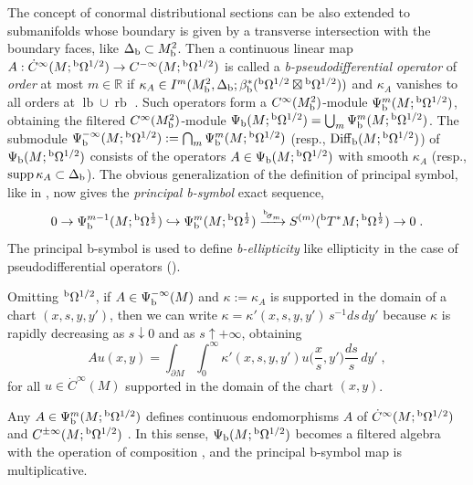 \documentclass{memo-l}
\theoremstyle{plain}
\theoremstyle{definition}
\theoremstyle{remark}
\newcommand{\R}{\mathbb{R}}
\newcommand{\supp}{\operatorname{supp}}
\newcommand{\Diff}{\operatorname{Diff}}
\newcommand{\lb}{\operatorname{lb}}
\newcommand{\rb}{\operatorname{rb}}
\newcommand{\bOmega}{{}^{\text{\rm b}}\Omega}
\newcommand{\bT}{{}^{\text{\rm b}}T}
\newcommand{\bsigma}{{}^{\text{\rm b}}\!\sigma}
\newcommand{\Psib}{\Psi_{\text{\rm b}}}
\newcommand{\Diffb}{\Diff_{\text{\rm b}}}
\newcommand{\Deltab}{\Delta_{\text{\rm b}}}
\numberwithin{section}{chapter}
\numberwithin{equation}{section}%
\begin{document}
The concept of conormal distributional sections can be also extended to submanifolds whose boundary is given by a transverse intersection with the boundary faces, like $\Deltab\subset M^2_{\text{\rm b}}$. Then a continuous linear map $A:\dot C^\infty(M;\bOmega^{1/2})\to C^{-\infty}(M;\bOmega^{1/2})$ is called a \emph{b-pseudodifferential operator}  of \emph{order} at most $m\in\R$ if $\kappa_A\in I^m(M^2_{\text{\rm b}},\Deltab;\beta_{\text{\rm b}}^*(\bOmega^{1/2}\boxtimes\bOmega^{1/2}))$ and $\kappa_A$ vanishes to all orders at $\lb\cup\rb$ \cite[Definition~4.22]{Melrose1993}. Such operators form a $C^\infty(M^2_{\text{\rm b}})$-module $\Psib^m(M;\bOmega^{1/2})$, obtaining the filtered $C^\infty(M^2_{\text{\rm b}})$-module $\Psib(M;\bOmega^{1/2})=\bigcup_m\Psib^m(M;\bOmega^{1/2})$. The submodule $\Psib^{-\infty}(M;\bOmega^{1/2}):=\bigcap_m\Psib^m(M;\bOmega^{1/2})$ (resp., $\Diffb(M;\bOmega^{1/2})$) of $\Psib(M;\bOmega^{1/2})$ consists of the operators $A\in\Psib(M;\bOmega^{1/2})$ with smooth $\kappa_A$ (resp., $\supp\kappa_A\subset\Deltab$).  The obvious generalization of the definition of principal symbol, like in , now gives the \emph{principal b-symbol} exact sequence,  \index{$\bsigma_m$}
\[
0\to\Psib^{m-1}(M;\bOmega^{\frac12})\hookrightarrow\Psib^m(M;\bOmega^{\frac12}) 
\xrightarrow{\bsigma_m} S^{(m)}(\bT^*M;\bOmega^{\frac12})\to0\;.
\]
The principal b-symbol is used to define \emph{b-ellipticity}  like ellipticity in the case of pseudodifferential operators ().

Omitting $\bOmega^{1/2}$, if $A\in\Psib^{-\infty}(M)$ and $\kappa:=\kappa_A$ is supported in the domain of a chart $(x,s,y,y')$, then we can write $\kappa=\kappa'(x,s,y,y')\,s^{-1}ds\,dy'$ because $\kappa$ is rapidly decreasing as $s\downarrow0$ and as $s\uparrow+\infty$, obtaining 
\begin{equation}\label{Au(x y) = ...}
Au(x,y)=\int_{\partial M}\int_0^\infty\kappa'(x,s,y,y')u\Big(\frac{x}{s},y'\Big)\frac{ds}{s}\,dy'\;,
\end{equation}
for all $u\in\dot C^\infty(M)$ supported in the domain of the chart $(x,y)$.

Any $A\in\Psib^m(M;\bOmega^{1/2})$ defines continuous endomorphisms $A$ of $\dot C^\infty(M;\bOmega^{1/2})$ and $C^{\pm\infty}(M;\bOmega^{1/2})$ \cite[Propositions~4.29 and~4.34 and Exercise 4.33]{Melrose1993}. In this sense, $\Psib(M;\bOmega^{1/2})$ becomes a filtered algebra with the operation of composition \cite[Propositions~5.20]{Melrose1993}, and the principal b-symbol map is multiplicative.
\end{document}
